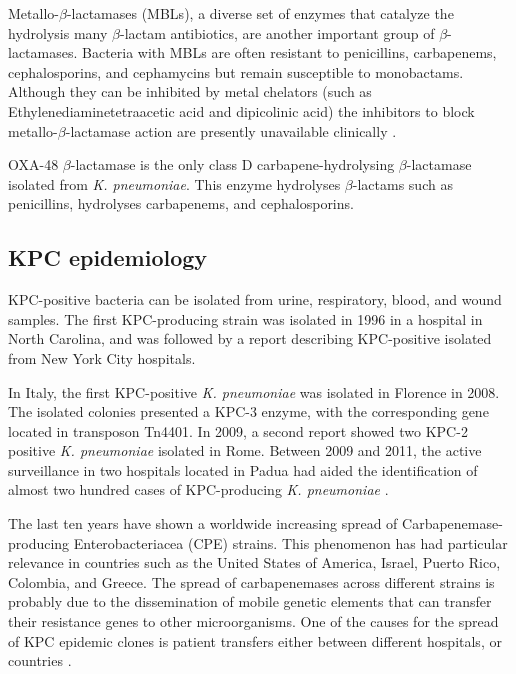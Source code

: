 \documentclass[11pt]{report}
\begin{document}
Metallo-$\beta$-lactamases (MBLs), a diverse set of enzymes that catalyze the hydrolysis many $\beta$-lactam antibiotics, are another important group of $\beta$-lactamases.
Bacteria with MBLs are often resistant to penicillins, carbapenems, cephalosporins, and cephamycins but remain susceptible to monobactams. Although they can be inhibited by metal chelators (such as Ethylenediaminetetraacetic acid and dipicolinic acid) the inhibitors to block metallo-$\beta$-lactamase action are presently unavailable clinically \cite{palzkill2013metallo}.

OXA-48 $\beta$-lactamase is the only class D carbapene-hydrolysing $\beta$-lactamase isolated from \emph{K. pneumoniae}.
This enzyme hydrolyses $\beta$-lactams such as penicillins, hydrolyses carbapenems, and cephalosporins.


\subsection{KPC epidemiology}

KPC-positive bacteria can be isolated from urine, respiratory, blood, and wound samples.
The first KPC-producing strain was isolated in 1996 in a hospital in North Carolina, and was followed by a report describing KPC-positive isolated from New York City hospitals.

In Italy, the first KPC-positive \emph{K. pneumoniae} was isolated in Florence in 2008.
The isolated colonies presented a KPC-3 enzyme, with the corresponding gene located in transposon Tn4401.
In 2009, a second report showed two KPC-2 positive \emph{K. pneumoniae} isolated in Rome.
Between 2009 and 2011, the active surveillance in two hospitals located in Padua had aided the identification of almost two hundred cases of KPC-producing \emph{K. pneumoniae} \cite{MunozPrice2013}.

The last ten years have shown a worldwide increasing spread of Carbapenemase-producing Enterobacteriacea (CPE) strains.
This phenomenon has had particular relevance in countries such as the United States of America, Israel, Puerto Rico, Colombia, and Greece.
The spread of carbapenemases across different strains is probably due to the dissemination of mobile genetic elements that can transfer their resistance genes to other microorganisms.
One of the causes for the spread of KPC epidemic clones is patient transfers either between different hospitals, or countries \cite{circolare2013}.

\clearpage
\end{document}
